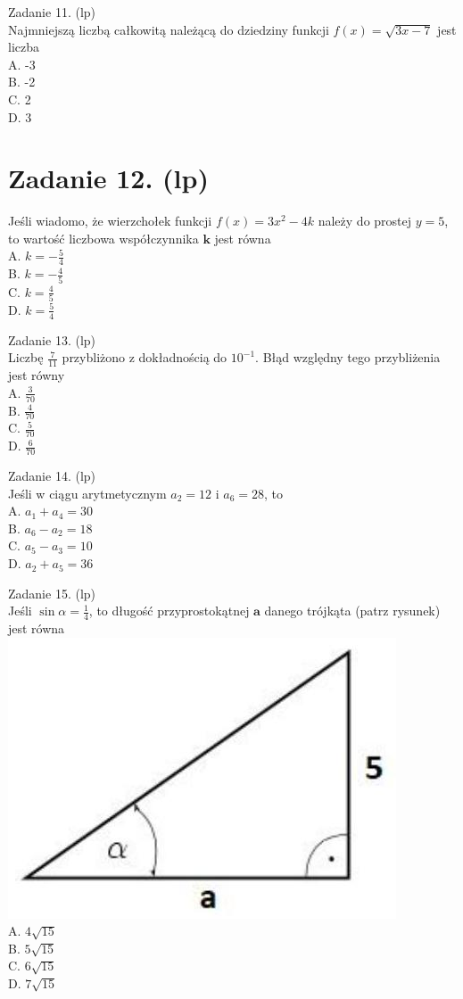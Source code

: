 \documentclass[10pt]{article}
\begin{document}
Zadanie 11. (lp)\\
Najmniejszą liczbą całkowitą należącą do dziedziny funkcji \(f(x)=\sqrt{3 x-7}\) jest liczba\\
A. -3\\
B. -2\\
C. 2\\
D. 3

\section*{Zadanie 12. (lp)}
Jeśli wiadomo, że wierzchołek funkcji \(f(x)=3 x^{2}-4 k\) należy do prostej \(y=5\), to wartość liczbowa współczynnika \(\boldsymbol{k}\) jest równa\\
A. \(k=-\frac{5}{4}\)\\
B. \(k=-\frac{4}{5}\)\\
C. \(k=\frac{4}{5}\)\\
D. \(k=\frac{5}{4}\)

Zadanie 13. (lp)\\
Liczbę \(\frac{7}{11}\) przybliżono z dokładnością do \(10^{-1}\). Błąd względny tego przybliżenia jest równy\\
A. \(\frac{3}{70}\)\\
B. \(\frac{4}{70}\)\\
C. \(\frac{5}{70}\)\\
D. \(\frac{6}{70}\)

Zadanie 14. (lp)\\
Jeśli w ciągu arytmetycznym \(a_{2}=12\) i \(a_{6}=28\), to\\
A. \(a_{1}+a_{4}=30\)\\
B. \(a_{6}-a_{2}=18\)\\
C. \(a_{5}-a_{3}=10\)\\
D. \(a_{2}+a_{5}=36\)

Zadanie 15. (lp)\\
Jeśli \(\sin \alpha=\frac{1}{4}\), to długość przyprostokątnej \(\boldsymbol{a}\) danego trójkąta (patrz rysunek) jest równa\\
\includegraphics[max width=\textwidth, center]{2024_11_21_90ea54b753259b37713ag-04}\\
A. \(4 \sqrt{15}\)\\
B. \(5 \sqrt{15}\)\\
C. \(6 \sqrt{15}\)\\
D. \(7 \sqrt{15}\)
\end{document}
